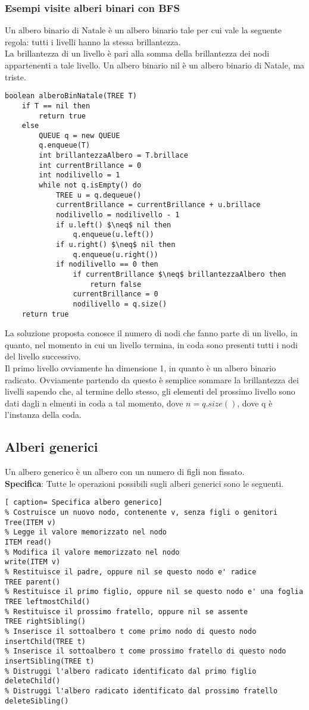 \documentclass[../cheatSheetAlgoritmi.tex]{subfiles}
\begin{document}
\subsubsection{Esempi visite alberi binari con BFS}
Un albero binario di Natale è un albero binario tale per cui vale la seguente regola: tutti i livelli hanno la stessa brillantezza.  \\La brillantezza di un livello è pari alla somma della brillantezza dei nodi appartenenti a tale livello.  Un albero binario nil è un albero binario di Natale, ma triste.
\begin{lstlisting}[caption=Esempi BFS alberi binari]
boolean alberoBinNatale(TREE T)
	if T == nil then
		return true
	else
		QUEUE q = new QUEUE
		q.enqueue(T)
		int brillantezzaAlbero = T.brillace
		int currentBrillance = 0
		int nodilivello = 1
		while not q.isEmpty() do
			TREE u = q.dequeue()
			currentBrillance = currentBrillance + u.brillace
			nodilivello = nodilivello - 1
			if u.left() $\neq$ nil then
				q.enqueue(u.left())
			if u.right() $\neq$ nil then
				q.enqueue(u.right())
			if nodilivello == 0 then
				if currentBrillance $\neq$ brillantezzaAlbero then
					return false
				currentBrillance = 0
				nodilivello = q.size()
	return true
\end{lstlisting}
\newpage
La soluzione proposta conosce il numero di nodi che fanno parte di un livello, in quanto, nel momento in cui un livello termina, in coda sono presenti tutti i nodi del livello successivo. \\
Il primo livello ovviamente ha dimensione 1, in quanto è un albero binario radicato. Ovviamente partendo da questo è semplice sommare la brillantezza dei livelli sapendo che, al termine dello stesso, gli elementi del prossimo livello sono dati dagli n elmenti in coda a tal momento, dove $n = q.size()$, dove q è l'instanza della coda.

\subsection{Alberi generici}
Un albero generico è un albero con un numero di figli non fissato.\\
\textbf{Specifica}: Tutte le operazioni possibili sugli alberi generici sono le seguenti. 
\begin{lstlisting}[ caption= Specifica albero generico]
% Costruisce un nuovo nodo, contenente v, senza figli o genitori
Tree(ITEM v)
% Legge il valore memorizzato nel nodo
ITEM read()
% Modifica il valore memorizzato nel nodo
write(ITEM v)
% Restituisce il padre, oppure nil se questo nodo e' radice
TREE parent()
% Restituisce il primo figlio, oppure nil se questo nodo e' una foglia
TREE leftmostChild()
% Restituisce il prossimo fratello, oppure nil se assente
TREE rightSibling()
% Inserisce il sottoalbero t come primo nodo di questo nodo
insertChild(TREE t)
% Inserisce il sottoalbero t come prossimo fratello di questo nodo
insertSibling(TREE t)
% Distruggi l'albero radicato identificato dal primo figlio
deleteChild()
% Distruggi l'albero radicato identificato dal prossimo fratello
deleteSibling()
\end{lstlisting}
\end{document}
